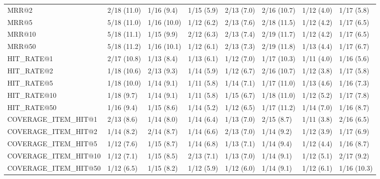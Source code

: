 \begin{tabular}{llllllll}
MRR@2                       &     2/18 (11.0) &       1/16 (9.4) &  1/15 (5.9) &  2/13 (7.0) &  2/16 (10.7) &     1/12 (4.0) &            1/17 (5.8) \\
MRR@5                       &     5/18 (11.0) &      1/16 (10.0) &  1/12 (6.2) &  2/13 (7.6) &  2/18 (11.5) &     1/12 (4.2) &            1/17 (6.5) \\
MRR@10                      &     5/18 (11.1) &       1/15 (9.9) &  2/12 (6.3) &  2/13 (7.4) &  2/19 (11.7) &     1/12 (4.2) &            1/17 (6.5) \\
MRR@50                      &     5/18 (11.2) &      1/16 (10.1) &  1/12 (6.1) &  2/13 (7.3) &  2/19 (11.8) &     1/13 (4.4) &            1/17 (6.7) \\
HIT_RATE@1                  &     2/17 (10.8) &       1/13 (8.4) &  1/13 (6.1) &  1/12 (7.0) &  1/17 (10.3) &     1/11 (4.0) &            1/16 (5.6) \\
HIT_RATE@2                  &     1/18 (10.6) &       2/13 (9.3) &  1/14 (5.9) &  1/12 (6.7) &  2/16 (10.7) &     1/12 (3.8) &            1/17 (5.8) \\
HIT_RATE@5                  &     1/18 (10.0) &       1/14 (9.1) &  1/11 (5.8) &  1/14 (7.1) &  1/17 (11.0) &     1/13 (4.6) &            1/16 (7.3) \\
HIT_RATE@10                 &      1/18 (9.7) &       1/14 (9.1) &  1/11 (5.8) &  1/15 (6.7) &  1/18 (11.0) &     1/12 (5.2) &            1/17 (7.8) \\
HIT_RATE@50                 &      1/16 (9.4) &       1/15 (8.6) &  1/14 (5.2) &  1/12 (6.5) &  1/17 (11.2) &     1/14 (7.0) &            1/16 (8.7) \\
COVERAGE_ITEM_HIT@1         &      2/13 (8.6) &       1/14 (8.0) &  1/14 (6.4) &  1/13 (7.0) &   2/15 (8.7) &     1/11 (3.8) &            2/16 (6.5) \\
COVERAGE_ITEM_HIT@2         &      1/14 (8.2) &       2/14 (8.7) &  1/14 (6.6) &  2/13 (7.0) &   1/14 (9.2) &     1/12 (3.9) &            1/17 (6.9) \\
COVERAGE_ITEM_HIT@5         &      1/12 (7.6) &       1/15 (8.7) &  1/14 (6.8) &  1/13 (7.1) &   1/14 (9.4) &     1/12 (4.4) &            1/16 (8.7) \\
COVERAGE_ITEM_HIT@10        &      1/12 (7.1) &       1/15 (8.5) &  2/13 (7.1) &  1/13 (7.0) &   1/14 (9.1) &     1/12 (5.1) &            2/17 (9.2) \\
COVERAGE_ITEM_HIT@50        &      1/12 (6.5) &       1/15 (8.2) &  1/12 (5.9) &  1/12 (6.0) &   1/14 (9.1) &     1/12 (6.1) &           1/16 (10.3) \\
\bottomrule
\end{tabular}
